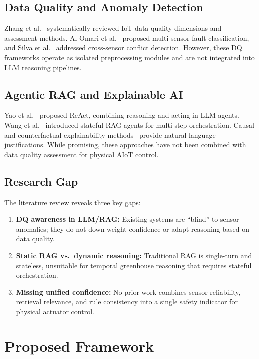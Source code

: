 \documentclass[runningheads]{llncs}
\begin{document}
\subsection{Data Quality and Anomaly Detection}
Zhang et al.~\cite{zhang2023dq} systematically reviewed IoT data quality dimensions and assessment methods. Al-Omari et al.~\cite{alomari2024multisensor} proposed multi-sensor fault classification, and Silva et al.~\cite{silva2024conflict} addressed cross-sensor conflict detection. However, these DQ frameworks operate as isolated preprocessing modules and are not integrated into LLM reasoning pipelines.

\subsection{Agentic RAG and Explainable AI}
Yao et al.~\cite{yao2023react} proposed ReAct, combining reasoning and acting in LLM agents. Wang et al.~\cite{wang2024stateful} introduced stateful RAG agents for multi-step orchestration. Causal and counterfactual explainability methods~\cite{cema2025xai} provide natural-language justifications. While promising, these approaches have not been combined with data quality assessment for physical AIoT control.

\subsection{Research Gap}
The literature review reveals three key gaps:
\begin{enumerate}
    \item \textbf{DQ awareness in LLM/RAG:} Existing systems are ``blind'' to sensor anomalies; they do not down-weight confidence or adapt reasoning based on data quality.
    \item \textbf{Static RAG vs.\ dynamic reasoning:} Traditional RAG is single-turn and stateless, unsuitable for temporal greenhouse reasoning that requires stateful orchestration.
    \item \textbf{Missing unified confidence:} No prior work combines sensor reliability, retrieval relevance, and rule consistency into a single safety indicator for physical actuator control.
\end{enumerate}

\section{Proposed Framework}
\end{document}
